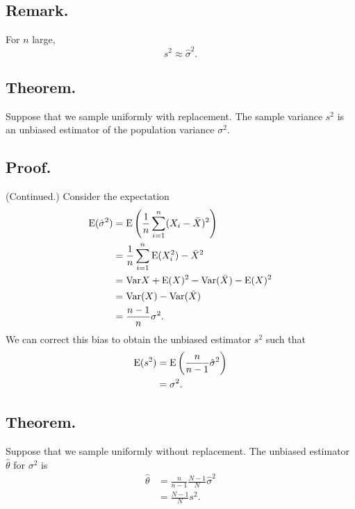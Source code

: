 \documentclass[titlepage]{article}
\begin{document}
\subsection{Remark.} For $n$ large, 
$$s^{2} \approx \hat{\sigma}^{2}.$$

\subsection{Theorem.} Suppose that we sample uniformly with replacement. The sample variance $s^{2}$ is an unbiased estimator of the population variance $\sigma^{2}$.

\subsection{Proof.} (Continued.) Consider the expectation 
\begin{align*}
    \text{E}(\hat{\sigma}^{2}) &= \text{E}\left(\frac{1}{n}\sum_{i=1}^{n}(X_{i} - \bar{X})^{2}\right) \\
                         &= \frac{1}{n}\sum_{i=1}^{n}\text{E}(X_{i}^{2}) - \bar{X}^{2} \\
                         &= \text{Var}{X} + \text{E}(X)^{2} - \text{Var}(\bar{X}) - \text{E}(X)^{2} \\
                         &= \text{Var}(X) - \text{Var}(\bar{X}) \\
                         &= \frac{n-1}{n}\sigma^{2}.
\end{align*}
We can correct this bias to obtain the unbiased estimator $s^{2}$ such that 
\begin{align*}
    \text{E}(s^{2}) &= \text{E}\left(\frac{n}{n-1}\hat{\sigma}^{2}\right) \\
              &= \sigma^{2}.
\end{align*}

\subsection{Theorem.} Suppose that we sample uniformly without replacement. The unbiased estimator $\hat{\theta}$ for $\sigma^{2}$ is 
\begin{align*}
    \hat{\theta} &= \frac{n}{n-1}\frac{N-1}{N}\hat{\sigma}^{2} \\
                 &= \frac{N-1}{N}s^{2}.
\end{align*}
\end{document}
